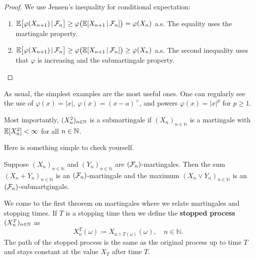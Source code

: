 \begin{proof}
	We use Jensen's inequality for conditional expectation:
	\begin{enumerate}[label=(\roman*)]
		\item
			$\mathbb{E} \big[\varphi(X_{n+1})\,|\,\mathcal{F}_n\big] \geq \varphi \big( \mathbb{E}[X_{n+1}\,|\,\mathcal{F}_n]\big) = \varphi(X_n)$ a.s. The equality uses the martingale property.
		\item
			$\mathbb{E} \big[\varphi(X_{n+1})\,|\,\mathcal{F}_n\big] \geq \varphi \big( \mathbb{E}[X_{n+1}\,|\,\mathcal{F}_n]\big) \geq \varphi (X_n)$ a.s. The second inequality uses that $\varphi$ is increasing and the submartingale property.
	\end{enumerate}
\end{proof}
As usual, the simplest examples are the most useful ones. One can regularly see the use of $\varphi (x) = \left| x \right|$, $\varphi (x) = (x-a)^+ $, and powers $\varphi (x) = \left| x \right|^p$ for $p \geq 1$.
\begin{lwarnhinweis}
	Most importantly, $(X_n^2)_{n\in\mathbb{N}}$ is a submartingale if $(X_n)_{n\in\mathbb{N}}$ is a martingale with $\mathbb{E}[X_n^2]<\infty$ for all $n\in\mathbb{N}$.
\end{lwarnhinweis}
Here is something simple to check yourself. 
\begin{luebung}
	Suppose $(X_n)_{n\in\mathbb{N}}$ and $(Y_n)_{n\in\mathbb{N}}$ are $(\mathcal{F}_n)$-martingales.
	Then the sum $(X_n+Y_n)_{n\in\mathbb{N}}$ is an $(\mathcal{F}_n)$-martingale and the maximum $(X_n \vee Y_n)_{n\in\mathbb{N}}$ is an $(\mathcal{F}_n)$-submartgingale.
\end{luebung}
We come to the first theorem on martingales where we relate martingales and stopping times. If $T$ is a stopping time then we define the \textbf{stopped process} $(X^T_n)_{n\in \mathbb{N}}$ as $$X_n^T(\omega)\coloneqq X_{n \wedge T(\omega)}(\omega),\quad n \in \mathbb{N}.$$ The path of the stopped process is the same as the original process up to time $T$ and stays constant at the value $X_T$ after time $T$. 
